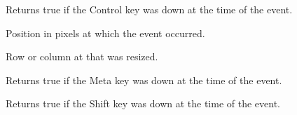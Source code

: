 \label{wxgridsizeeventcontroldown}


Returns true if the Control key was down at the time of the event.

\label{wxgridsizeeventgetposition}


Position in pixels at which the event occurred.

\label{wxgridsizeeventgetroworcol}


Row or column at that was resized.

\label{wxgridsizeeventmetadown}


Returns true if the Meta key was down at the time of the event.

\label{wxgridsizeeventshiftdown}


Returns true if the Shift key was down at the time of the event.

